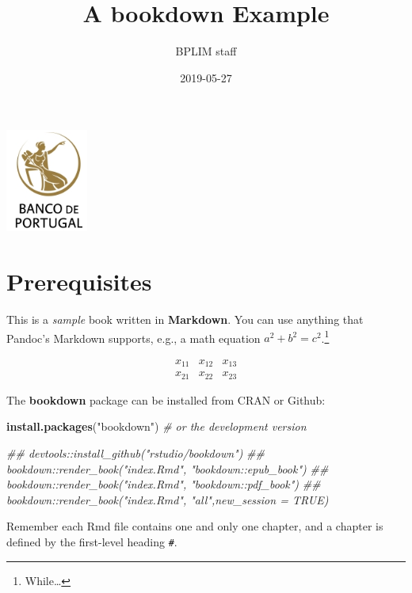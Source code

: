 \documentclass[]{book}
\title{A bookdown Example}
\author{BPLIM staff}
\date{2019-05-27}
\newenvironment{Shaded}{\begin{snugshade}}{\end{snugshade}}
\newcommand{\CommentTok}[1]{\textcolor[rgb]{0.56,0.35,0.01}{\textit{#1}}}
\newcommand{\KeywordTok}[1]{\textcolor[rgb]{0.13,0.29,0.53}{\textbf{#1}}}
\newcommand{\NormalTok}[1]{#1}
\newcommand{\StringTok}[1]{\textcolor[rgb]{0.31,0.60,0.02}{#1}}
\let\rmarkdownfootnote\footnote%
\def\footnote{\protect\rmarkdownfootnote}
\begin{document}
\maketitle

{
\setcounter{tocdepth}{1}
\tableofcontents
}
\includegraphics[width=0.328\linewidth]{media/logo}

\hypertarget{prerequisites}{%
\chapter{Prerequisites}\label{prerequisites}}

This is a \emph{sample} book written in \textbf{Markdown}. You can use anything that Pandoc's Markdown supports, e.g., a math equation \(a^2 + b^2 = c^2\).\footnote{While\ldots{}}

\[\begin{array}{ccc}
x_{11} & x_{12} & x_{13}\\
x_{21} & x_{22} & x_{23}
\end{array}\]

The \textbf{bookdown} package can be installed from CRAN or Github:

\begin{Shaded}
\begin{Highlighting}[]
\KeywordTok{install.packages}\NormalTok{(}\StringTok{"bookdown"}\NormalTok{)}
\CommentTok{# or the development version}

\CommentTok{## devtools::install_github("rstudio/bookdown")}
\CommentTok{## bookdown::render_book("index.Rmd", "bookdown::epub_book")}
\CommentTok{## bookdown::render_book("index.Rmd", "bookdown::pdf_book")}
\CommentTok{## bookdown::render_book("index.Rmd", "all",new_session = TRUE)}
\end{Highlighting}
\end{Shaded}

Remember each Rmd file contains one and only one chapter, and a chapter is defined by the first-level heading \texttt{\#}.
\end{document}
